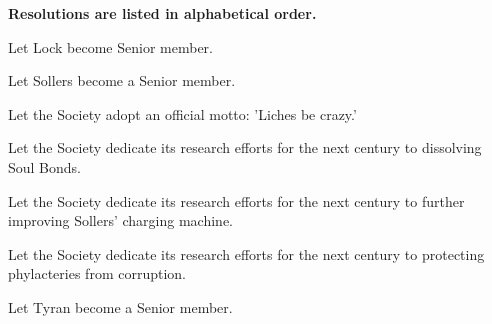 \documentclass[white]{Sel}
\begin{document}
\name{\wResolutions{}}
\textbf{Resolutions are listed in alphabetical order.}

Let Lock become Senior member.

Let Sollers become a Senior member.

Let the Society adopt an official motto: 'Liches be crazy.'

Let the Society dedicate its research efforts for the next century to dissolving Soul Bonds.

Let the Society dedicate its research efforts for the next century to further improving Sollers' charging machine.

Let the Society dedicate its research efforts for the next century to protecting phylacteries from corruption.

Let Tyran become a Senior member.
\end{document}
